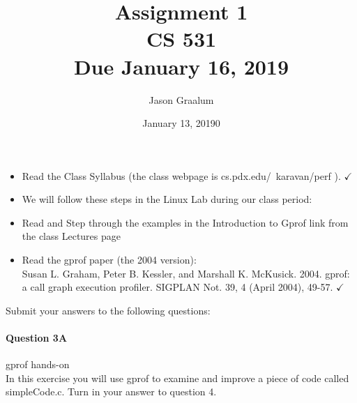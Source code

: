 \documentclass[11pt]{article}
\title{\bf Assignment 1 \\[2ex]
\rm\normalsize CS 531 \\ Due January 16, 2019}
\date{January 13, 20190}
\author{Jason Graalum}
\begin{document}
\maketitle

\begin{itemize}
\item Read the Class Syllabus (the class webpage is cs.pdx.edu/~karavan/perf ). $\checkmark$ 
\item We will follow these steps in the Linux Lab during our class period:
\item Read and Step through the examples in the Introduction to Gprof link from the class Lectures page
\item Read the gprof paper (the 2004 version):\\
Susan L. Graham, Peter B. Kessler, and Marshall K. McKusick. 2004. gprof: a call graph execution profiler. SIGPLAN Not. 39, 4 (April 2004), 49-57. $\checkmark$ 
\end{itemize}
Submit your answers to the following questions:\\
\paragraph{Question 3A} gprof hands-on\\
In this exercise you will use gprof to examine and improve a piece of code called simpleCode.c. Turn in your answer to question 4.
\end{document}
